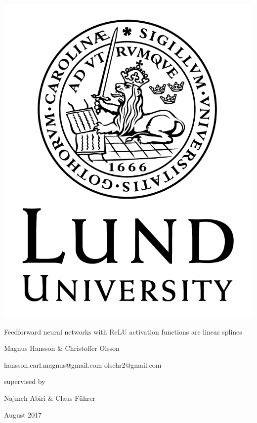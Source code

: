 \documentclass[11pt, letterpaper]{amsart}
\begin{document}
\begin{titlepage}
\begin{center}
\includegraphics[scale=0.2]{LundUniversity_C2line_BLACK.png}

\vspace{1cm}

\Large{Feedforward neural networks with ReLU activation functions are linear splines}

\vspace{0.5cm}

\large{Magnus Hansson $\&$ Christoffer Olsson}

\small{hansson.carl.magnus@gmail.com}
\small{olschr2@gmail.com}

\vspace{1cm}

supervised by\par 
Najmeh Abiri $\&$ Claus Führer


\vspace{1cm}

\large{August 2017}


\end{center}
\end{titlepage}
\end{document}
